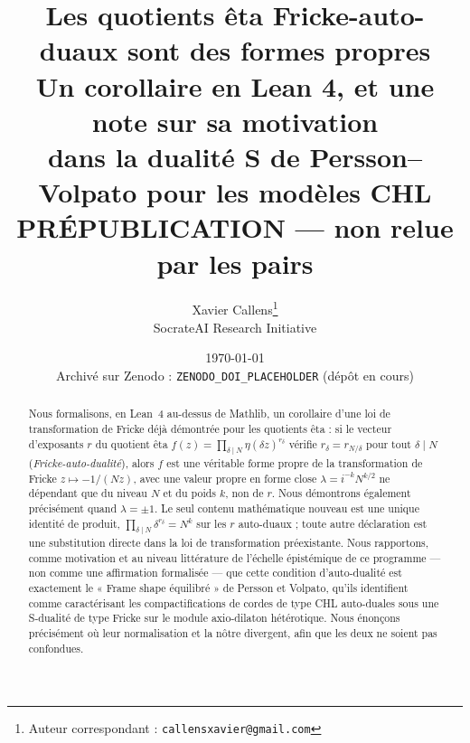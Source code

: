 \documentclass[11pt, a4paper]{article}
\title{\textbf{Les quotients êta Fricke-auto-duaux sont des formes propres}\\[0.3em]
  \large\textbf{Un corollaire en Lean 4, et une note sur sa motivation \\ dans la dualité S de
  Persson--Volpato pour les modèles CHL}\\[0.8em]
  \large\textcolor{BrickRed}{PRÉPUBLICATION --- non relue par les pairs}}
\author{
  Xavier Callens\thanks{Auteur correspondant : \texttt{callensxavier@gmail.com}} \\
  \small SocrateAI Research Initiative
}
\date{\today\\[0.6em]
  \small Archivé sur Zenodo : \texttt{ZENODO\_DOI\_PLACEHOLDER} (dépôt en cours)}
\theoremstyle{remark}
\begin{document}
\maketitle

\begin{center}
\end{center}

\begin{abstract}
Nous formalisons, en Lean~4 au-dessus de Mathlib, un corollaire d'une loi de transformation de
Fricke déjà démontrée pour les quotients êta : si le vecteur d'exposants $r$ du quotient êta
$f(z) = \prod_{\delta\mid N}\eta(\delta z)^{r_\delta}$ vérifie $r_\delta = r_{N/\delta}$ pour tout
$\delta\mid N$ (\emph{Fricke-auto-dualité}), alors $f$ est une véritable forme propre de la
transformation de Fricke $z\mapsto -1/(Nz)$, avec une valeur propre en forme close
$\lambda = i^{-k}N^{k/2}$ ne dépendant que du niveau $N$ et du poids $k$, non de $r$. Nous
démontrons également précisément quand $\lambda=\pm1$. Le seul contenu mathématique nouveau est
une unique identité de produit, $\prod_{\delta\mid N}\delta^{r_\delta}=N^k$ sur les $r$
auto-duaux ; toute autre déclaration est une substitution directe dans la loi de transformation
préexistante. Nous rapportons, comme motivation et au niveau littérature de l'échelle
épistémique de ce programme --- non comme une affirmation formalisée --- que cette condition
d'auto-dualité est exactement le « Frame shape équilibré » de Persson et Volpato, qu'ils
identifient comme caractérisant les compactifications de cordes de type CHL auto-duales sous une
S-dualité de type Fricke sur le module axio-dilaton hétérotique. Nous énonçons précisément où
leur normalisation et la nôtre divergent, afin que les deux ne soient pas confondues.
\end{abstract}
\end{document}
